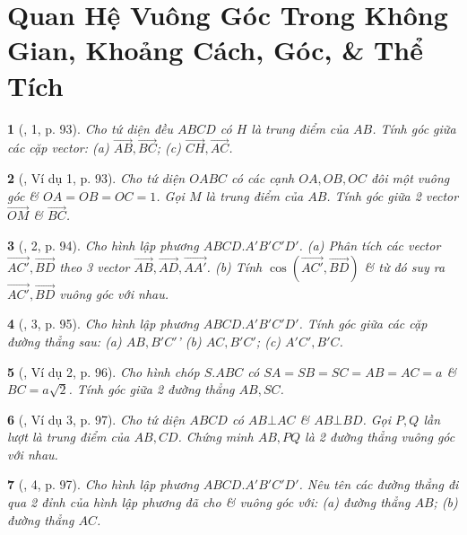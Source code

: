 \documentclass{article}
\newtheorem{baitoan}{}
\begin{document}
\section{Quan Hệ Vuông Góc Trong Không Gian, Khoảng Cách, Góc, \& Thể Tích}

\begin{baitoan}[\cite{SGK_Toan_11_hinh_hoc_co_ban}, 1, p. 93]
	Cho tứ diện đều $ABCD$ có $H$ là trung điểm của $AB$. Tính góc giữa các cặp vector: (a) $\overrightarrow{AB},\overrightarrow{BC}$; (c) $\overrightarrow{CH},\overrightarrow{AC}$.
\end{baitoan}

\begin{baitoan}[\cite{SGK_Toan_11_hinh_hoc_co_ban}, Ví dụ 1, p. 93]
	Cho tứ diện $OABC$ có các cạnh $OA,OB,OC$ đôi một vuông góc \& $OA = OB = OC = 1$. Gọi $M$ là trung điểm của $AB$. Tính góc giữa 2 vector $\overrightarrow{OM}$ \& $\overrightarrow{BC}$.
\end{baitoan}

\begin{baitoan}[\cite{SGK_Toan_11_hinh_hoc_co_ban}, 2, p. 94]
	Cho hình lập phương $ABCD.A'B'C'D'$. (a) Phân tích các vector $\overrightarrow{AC'},\overrightarrow{BD}$ theo 3 vector $\overrightarrow{AB},\overrightarrow{AD},\overrightarrow{AA'}$. (b) Tính $\cos(\overrightarrow{AC'},\overrightarrow{BD})$ \& từ đó suy ra $\overrightarrow{AC'},\overrightarrow{BD}$ vuông góc với nhau.
\end{baitoan}

\begin{baitoan}[\cite{SGK_Toan_11_hinh_hoc_co_ban}, 3, p. 95]
	Cho hình lập phương $ABCD.A'B'C'D'$. Tính góc giữa các cặp đường thẳng sau: (a) $AB,B'C'$' (b) $AC,B'C'$; (c) $A'C',B'C$.
\end{baitoan}

\begin{baitoan}[\cite{SGK_Toan_11_hinh_hoc_co_ban}, Ví dụ 2, p. 96]
	Cho hình chóp $S.ABC$ có $SA = SB = SC = AB = AC = a$ \& $BC = a\sqrt{2}$. Tính góc giữa 2 đường thẳng $AB,SC$.
\end{baitoan}

\begin{baitoan}[\cite{SGK_Toan_11_hinh_hoc_co_ban}, Ví dụ 3, p. 97]
	Cho tứ diện $ABCD$ có $AB\bot AC$ \& $AB\bot BD$. Gọi $P,Q$ lần lượt là trung điểm của $AB,CD$. Chứng minh $AB,PQ$ là 2 đường thẳng vuông góc với nhau.
\end{baitoan}

\begin{baitoan}[\cite{SGK_Toan_11_hinh_hoc_co_ban}, 4, p. 97]
	Cho hình lập phương $ABCD.A'B'C'D'$. Nêu tên các đường thẳng đi qua 2 đỉnh của hình lập phương đã cho \& vuông góc với: (a) đường thẳng $AB$; (b) đường thẳng $AC$.
\end{baitoan}
\end{document}
